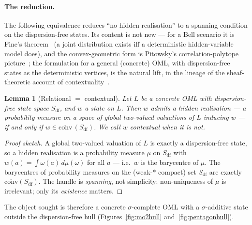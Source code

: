 \documentclass[11pt,reqno]{amsart}
\theoremstyle{plain}
\newtheorem{lemma}[theorem]{Lemma}
\theoremstyle{definition}
\theoremstyle{remark}
\begin{document}
\paragraph{The reduction.} The following equivalence reduces ``no hidden
realisation'' to a spanning condition on the dispersion-free states. Its content is
not new --- for a Bell scenario it is Fine's theorem~\cite{Fine1982} (a joint
distribution exists iff a deterministic hidden-variable model does), and the
convex-geometric form is Pitowsky's correlation-polytope picture~\cite{Pitowsky1989};
the formulation for a general (concrete) OML, with dispersion-free states as the
deterministic vertices, is the natural lift, in the lineage of the
sheaf-theoretic account of contextuality~\cite{AbramskyBrandenburger2011}.

\begin{lemma}[Relational $=$ contextual]\label{lem:relational}
Let $L$ be a concrete OML with dispersion-free state space $S_{\mathrm{df}}$, and
$w$ a state on $L$. Then $w$ admits a hidden realisation --- a probability measure
on a space of global two-valued valuations of $L$ inducing $w$ --- if and only if
$w \in \overline{\mathrm{conv}}\,(S_{\mathrm{df}})$. We call $w$ \emph{contextual}
when it is not.
\end{lemma}
\begin{proof}[Proof sketch]
A global two-valued valuation of $L$ is exactly a dispersion-free state, so a
hidden realisation is a probability measure $\mu$ on $S_{\mathrm{df}}$ with
$w(a)=\int \omega(a)\,d\mu(\omega)$ for all $a$ --- i.e.\ $w$ is the barycentre of
$\mu$. The barycentres of probability measures on the (weak-$*$ compact) set
$S_{\mathrm{df}}$ are exactly $\overline{\mathrm{conv}}(S_{\mathrm{df}})$. The
handle is \emph{spanning}, not simplicity: non-uniqueness of $\mu$ is irrelevant;
only its \emph{existence} matters.
\end{proof}

\noindent The object sought is therefore a concrete $\sigma$-complete OML with a
$\sigma$-additive state outside the dispersion-free hull
(Figures~\ref{fig:mo2hull} and~\ref{fig:pentagonhull}).
\end{document}
